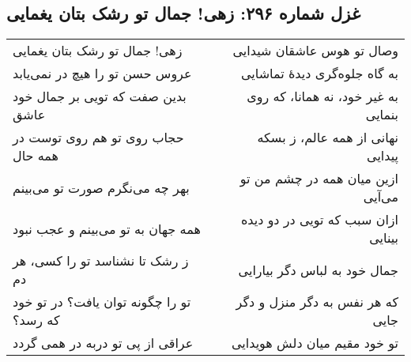 \begin{center}
\section*{غزل شماره ۲۹۶: زهی! جمال تو رشک بتان یغمایی}
\label{sec:296}
\begin{longtable}{l p{0.5cm} r}
زهی! جمال تو رشک بتان یغمایی
&&
وصال تو هوس عاشقان شیدایی
\\
عروس حسن تو را هیچ در نمی‌یابد
&&
به گاه جلوه‌گری دیدهٔ تماشایی
\\
بدین صفت که تویی بر جمال خود عاشق
&&
به غیر خود، نه همانا، که روی بنمایی
\\
حجاب روی تو هم روی توست در همه حال
&&
نهانی از همه عالم، ز بسکه پیدایی
\\
بهر چه می‌نگرم صورت تو می‌بینم
&&
ازین میان همه در چشم من تو می‌آیی
\\
همه جهان به تو می‌بینم و عجب نبود
&&
ازان سبب که تویی در دو دیده بینایی
\\
ز رشک تا نشناسد تو را کسی، هر دم
&&
جمال خود به لباس دگر بیارایی
\\
تو را چگونه توان یافت؟ در تو خود که رسد؟
&&
که هر نفس به دگر منزل و دگر جایی
\\
عراقی از پی تو دربه در همی گردد
&&
تو خود مقیم میان دلش هویدایی
\\
\end{longtable}
\end{center}
